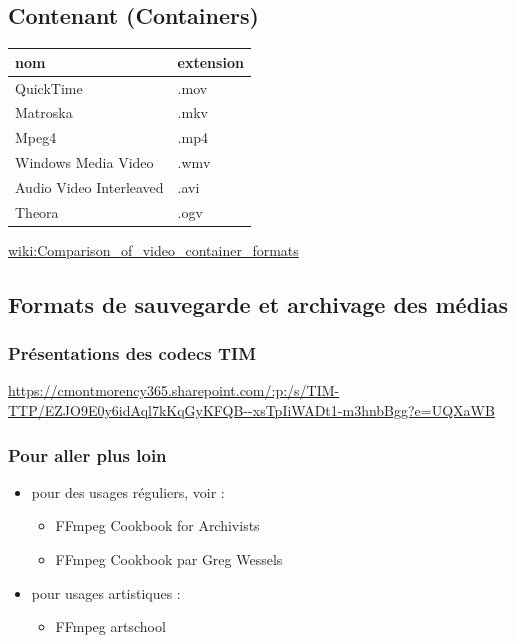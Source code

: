 \documentclass[
  french,
]{book}
\providecommand{\tightlist}{%
  \setlength{\itemsep}{0pt}\setlength{\parskip}{0pt}}
\begin{document}
\hypertarget{contenant-containers}{%
\subsection{Contenant (Containers)}\label{contenant-containers}}

\begin{longtable}[]{@{}ll@{}}
\toprule
nom & extension\tabularnewline
\midrule
\endhead
QuickTime & .mov\tabularnewline
Matroska & .mkv\tabularnewline
Mpeg4 & .mp4\tabularnewline
Windows Media Video & .wmv\tabularnewline
Audio Video Interleaved & .avi\tabularnewline
Theora & .ogv\tabularnewline
\bottomrule
\end{longtable}

\href{https://en.wikipedia.org/wiki/Comparison_of_video_container_formats}{wiki:Comparison\_of\_video\_container\_formats}

\hypertarget{formats-de-sauvegarde-et-archivage-des-muxe9dias}{%
\subsection{Formats de sauvegarde et archivage des médias}\label{formats-de-sauvegarde-et-archivage-des-muxe9dias}}

\hypertarget{pruxe9sentations-des-codecs-tim}{%
\subsubsection{Présentations des codecs TIM}\label{pruxe9sentations-des-codecs-tim}}

\url{https://cmontmorency365.sharepoint.com/:p:/s/TIM-TTP/EZJO9E0y6idAql7kKqGyKFQB--xsTpIiWADt1-m3hnbBgg?e=UQXaWB}

\hypertarget{pour-aller-plus-loin}{%
\subsubsection{Pour aller plus loin}\label{pour-aller-plus-loin}}

\begin{itemize}
\item
  pour des usages réguliers, voir :

  \begin{itemize}
  \tightlist
  \item
    FFmpeg Cookbook for Archivists \citep{kromer_FFmpegCookbookArchivists_2020}
  \item
    FFmpeg Cookbook par Greg Wessels \citep{wessels_FFmpegCookbook_2017}
  \end{itemize}
\item
  pour usages artistiques :

  \begin{itemize}
  \tightlist
  \item
    FFmpeg artschool \citep{associationofmovingimagearchivists_FFmpegArtschool_2020}
  \end{itemize}
\end{itemize}
\end{document}
